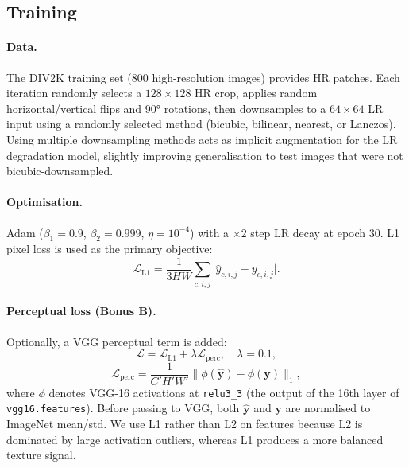 \documentclass{article}
\begin{document}
\subsection{Training}

\paragraph{Data.}
The DIV2K training set (800 high-resolution images) provides HR patches.
Each iteration randomly selects a $128{\times}128$ HR crop, applies random
horizontal/vertical flips and 90° rotations, then downsamples to a
$64{\times}64$ LR input using a randomly selected method (bicubic, bilinear,
nearest, or Lanczos).
Using multiple downsampling methods acts as implicit augmentation for the LR
degradation model, slightly improving generalisation to test images that were
not bicubic-downsampled.

\paragraph{Optimisation.}
Adam ($\beta_1 = 0.9$, $\beta_2 = 0.999$, $\eta = 10^{-4}$) with a $\times 2$
step LR decay at epoch 30.
L1 pixel loss is used as the primary objective:
\begin{equation}
  \mathcal{L}_{\text{L1}} = \frac{1}{3HW}
  \sum_{c,i,j} \bigl|\hat{y}_{c,i,j} - y_{c,i,j}\bigr|.
\end{equation}

\paragraph{Perceptual loss (Bonus B).}
Optionally, a VGG perceptual term is added:
\begin{equation}
  \mathcal{L} = \mathcal{L}_{\text{L1}} + \lambda \mathcal{L}_{\text{perc}},
  \quad \lambda = 0.1,
  \label{eq:perceptual}
\end{equation}
\begin{equation}
  \mathcal{L}_{\text{perc}} = \frac{1}{C'H'W'}
  \bigl\|\phi(\hat{\mathbf{y}}) - \phi(\mathbf{y})\bigr\|_1,
\end{equation}
where $\phi$ denotes VGG-16 activations at \texttt{relu3\_3} (the output of
the 16th layer of \texttt{vgg16.features}).
Before passing to VGG, both $\hat{\mathbf{y}}$ and $\mathbf{y}$ are normalised
to ImageNet mean/std.
We use L1 rather than L2 on features because L2 is dominated by large
activation outliers, whereas L1 produces a more balanced texture signal.
\end{document}
